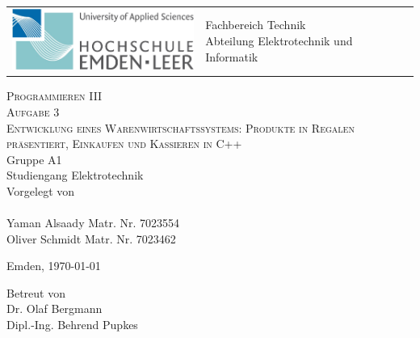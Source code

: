 \begin{titlepage}

\vspace{-0.5cm}
\hspace{-0.5cm}
\begin{tabular}{p{8.0cm} p{8.0cm}}
  \includegraphics[width = 6.0cm]{../tex/hsel-allgemein.png} &
   \parbox[b]{8.0cm}{
     {\large 	Fachbereich Technik }\\
     {\large 	Abteilung Elektrotechnik und Informatik }     
    } \\
   \\
   \hline
\end{tabular}
%
\begin{center}

\vspace{2.5cm}
\LARGE{\textsc{
    Programmieren III\\ Aufgabe 3
}}\\

\vspace{2.5cm}
\LARGE{\textsc{
{Entwicklung eines Warenwirtschaftssystems: Produkte in Regalen präsentiert, Einkaufen und Kassieren in C++}
}}\\

\vspace{2cm}%
\large
Gruppe A1\\
Studiengang Elektrotechnik\\
Vorgelegt von\\\ \\
Yaman Alsaady\hspace{2cm} Matr. Nr. 7023554\\
Oliver Schmidt\hspace{2cm} Matr. Nr. 7023462


\vspace{1cm} 
Emden, \today

\vspace{3.5cm}%
Betreut von\\ Dr. Olaf Bergmann\\Dipl.-Ing. Behrend Pupkes

\end{center}
\normalsize
\end{titlepage}
